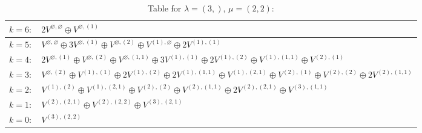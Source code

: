 \documentclass[a4paper,12pt]{article}
\begin{document}
\renewcommand{\arraystretch}{1.6} 
\begin{table}[H]
\centering
\caption{Table for $\lambda = (3,)$, $\mu = (2, 2)$:}
\begin{tabular}{|>{\centering\arraybackslash}p{15cm}|}
\hline
 $k = 6: \quad 2 V^{\varnothing, \varnothing} \oplus V^{\varnothing, (1)} $ \\ \hline
 $k = 5: \quad V^{\varnothing, \varnothing} \oplus 3 V^{\varnothing, (1)} \oplus V^{\varnothing, (2)} \oplus V^{(1), \varnothing} \oplus 2 V^{(1), (1)} $ \\ \hline
 $k = 4: \quad 2 V^{\varnothing, (1)} \oplus V^{\varnothing, (2)} \oplus V^{\varnothing, (1, 1)} \oplus 3 V^{(1), (1)} \oplus 2 V^{(1), (2)} \oplus V^{(1), (1, 1)} \oplus V^{(2), (1)} $ \\ \hline
 $k = 3: \quad V^{\varnothing, (2)} \oplus V^{(1), (1)} \oplus 2 V^{(1), (2)} \oplus 2 V^{(1), (1, 1)} \oplus V^{(1), (2, 1)} \oplus V^{(2), (1)} \oplus V^{(2), (2)} \oplus 2 V^{(2), (1, 1)} $ \\ \hline
 $k = 2: \quad V^{(1), (2)} \oplus V^{(1), (2, 1)} \oplus V^{(2), (2)} \oplus V^{(2), (1, 1)} \oplus 2 V^{(2), (2, 1)} \oplus V^{(3), (1, 1)} $ \\ \hline
 $k = 1: \quad V^{(2), (2, 1)} \oplus V^{(2), (2, 2)} \oplus V^{(3), (2, 1)} $ \\ \hline
 $k = 0: \quad V^{(3), (2, 2)} $ \\ \hline
\end{tabular}
\end{table}
\end{document}
